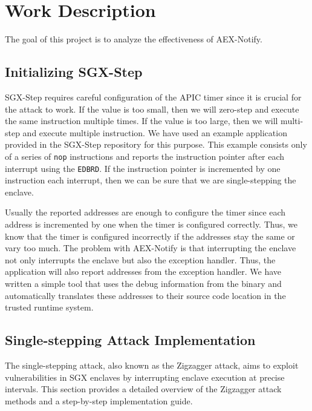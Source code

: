\documentclass{llncs}
\begin{document}

\section{Work Description}

The goal of this project is to analyze the effectiveness of AEX-Notify.

\subsection{Initializing SGX-Step}

SGX-Step requires careful configuration of the APIC timer
since it is crucial for the attack to work.
If the value is too small, then we will zero-step and execute the same instruction multiple times.
If the value is too large, then we will multi-step and execute multiple instruction.
We have used an example application provided in the SGX-Step repository for this purpose.
This example consists only of a series of \texttt{nop} instructions and
reports the instruction pointer after each interrupt using the \texttt{EDBRD}.
If the instruction pointer is incremented by one instruction each interrupt,
then we can be sure that we are single-stepping the enclave.

Usually the reported addresses are enough to configure the timer
since each address is incremented by one when the timer is configured correctly.
Thus, we know that the timer is configured incorrectly if the addresses stay
the same or vary too much.
The problem with AEX-Notify is that interrupting the enclave not only
interrupts the enclave but also the exception handler.
Thus, the application will also report addresses from the exception handler.
We have written a simple tool that uses the debug information from the binary and
automatically translates these addresses to their source code location in the trusted runtime system.

\subsection{Single-stepping Attack Implementation}

The single-stepping attack, also known as the Zigzagger attack,
aims to exploit vulnerabilities in SGX enclaves
by interrupting enclave execution at precise intervals.
This section provides a detailed overview of the Zigzagger attack methods and a step-by-step implementation guide.
\end{document}
